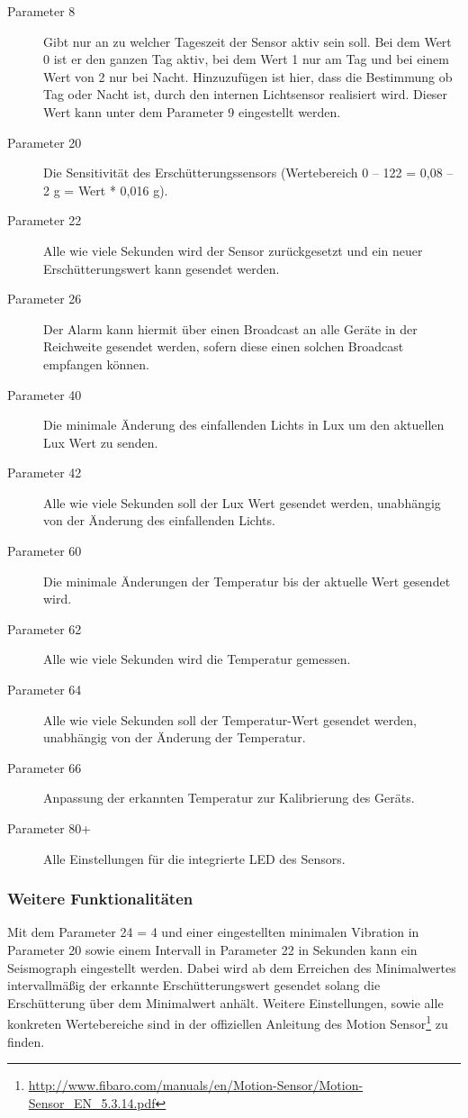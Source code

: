 \begin{description}
	\item [Parameter 8] Gibt nur an zu welcher Tageszeit der Sensor aktiv sein soll. Bei dem Wert 0 ist er den ganzen Tag aktiv, bei dem Wert 1 nur am Tag und bei einem Wert von 2 nur bei Nacht. Hinzuzufügen ist hier, dass die Bestimmung ob Tag oder Nacht ist, durch den internen Lichtsensor realisiert wird. Dieser Wert kann unter dem Parameter 9 eingestellt werden.
	\item [Parameter 20] Die Sensitivität des Erschütterungssensors (Wertebereich 0 – 122 = 0,08 –  2 g = Wert * 0,016 g).
	\item [Parameter 22] Alle wie viele Sekunden wird der Sensor zurückgesetzt und ein neuer Erschütterungswert kann gesendet werden.
	\item [Parameter 26] Der Alarm kann hiermit über einen Broadcast an alle Geräte in der Reichweite gesendet werden, sofern diese einen solchen Broadcast empfangen können.
	\item [Parameter 40] Die minimale Änderung des einfallenden Lichts in Lux um den aktuellen Lux Wert zu senden.
	\item [Parameter 42] Alle wie viele Sekunden soll der Lux Wert gesendet werden, unabhängig von der Änderung des einfallenden Lichts.
	\item [Parameter 60] Die minimale Änderungen der Temperatur bis der aktuelle Wert gesendet wird.
	\item [Parameter 62] Alle wie viele Sekunden wird die Temperatur gemessen.
	\item [Parameter 64] Alle wie viele Sekunden soll der Temperatur-Wert gesendet werden, unabhängig von der Änderung der Temperatur.
	\item [Parameter 66] Anpassung der erkannten Temperatur zur Kalibrierung des Geräts.
	\item [Parameter 80+] Alle Einstellungen für die integrierte LED des Sensors.
\end{description}

\subsubsection{Weitere Funktionalitäten}
Mit dem Parameter 24 = 4 und einer eingestellten minimalen Vibration in Parameter 20 sowie einem Intervall in Parameter 22 in Sekunden kann ein Seismograph eingestellt werden. Dabei wird ab dem Erreichen des Minimalwertes intervallmäßig der erkannte Erschütterungswert gesendet solang die Erschütterung über dem Minimalwert anhält.
Weitere Einstellungen, sowie alle konkreten Wertebereiche sind in der offiziellen Anleitung des Motion Sensor\footnote{\url{http://www.fibaro.com/manuals/en/Motion-Sensor/Motion-Sensor_EN_5.3.14.pdf}} zu finden.\\

